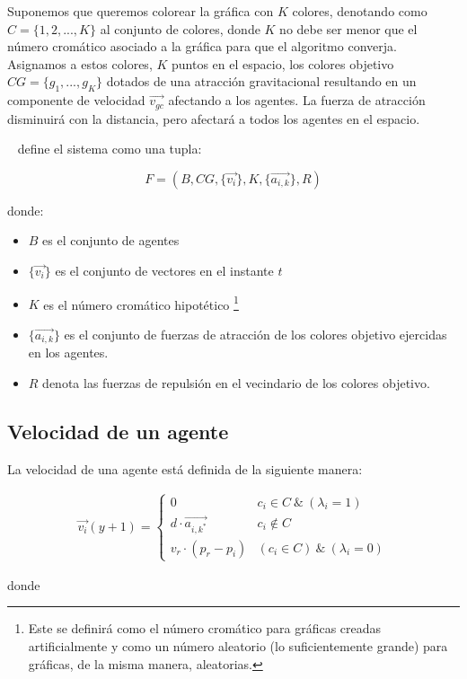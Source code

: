 \documentclass[a4paper]{report}
\begin{document}
Suponemos que queremos colorear la gr\'afica con $K$ colores, denotando
como $C = \{1, 2, ..., K\}$ al conjunto de colores, donde $K$ no debe ser menor
que el n\'umero crom\'atico asociado a la gr\'afica para que el algoritmo
converja. Asignamos a estos colores, $K$ puntos en el espacio, los colores
objetivo $CG = \{g_1, ..., g_K\}$ dotados de una atracci\'on gravitacional
resultando en un componente de velocidad $\vec{v_{gc}}$ afectando a los agentes.
La fuerza de atracci\'on disminuir\'a con la distancia, pero afectar\'a a todos
los agentes en el espacio.

~\cite{israel} define el sistema como una tupla:

\[F = (B, CG, \{\vec{v_i}\}, K, \{\vec{a_{i, k}}\}, R)\]

donde:

\begin{itemize}
\item $B$ es el conjunto de agentes
\item $\{\vec{v_i}\}$ es el conjunto de vectores en el instante $t$
\item $K$ es el n\'umero crom\'atico hipot\'etico \footnote{Este se definir\'a
    como el n\'umero crom\'atico para gr\'aficas creadas artificialmente y
    como un n\'umero aleatorio (lo suficientemente grande) para gr\'aficas, de la
    misma manera, aleatorias.}
\item $\{\vec{a_{i, k}}\}$ es el conjunto de fuerzas de atracci\'on de los colores
  objetivo ejercidas en los agentes.
\item $R$ denota las fuerzas de repulsi\'on en el vecindario de los colores objetivo.
\end{itemize}

\subsection{Velocidad de un agente}
La velocidad de una agente est\'a definida de la siguiente manera:

\begin{align*}
  \vec{v_i}(y+1) =
  \begin{cases}
    0 & c_i \in C \ \& \ (\lambda_i = 1)\\
    d \cdot \vec{a_{i, k^*}} & c_i \not \in C\\
    v_r \cdot (p_r - p_i) & (c_i \in C) \ \& \ (\lambda_i = 0)
  \end{cases}
\end{align*}

donde
\end{document}

